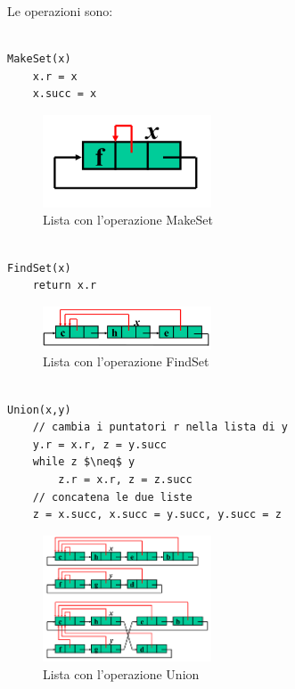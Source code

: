 Le operazioni sono:

\begin{lstlisting}

MakeSet(x)
	x.r = x
	x.succ = x

\end{lstlisting}

\begin{figure}[htpd]
\centering
\includegraphics[width=50mm]{images/list-make-set.png}
\caption{Lista con l'operazione MakeSet}
\end{figure}

\begin{lstlisting}

FindSet(x)
	return x.r

\end{lstlisting}

\begin{figure}[htpd]
\centering
\includegraphics[width=50mm]{images/list-find-set.png}
\caption{Lista con l'operazione FindSet}
\end{figure}

\begin{lstlisting}[mathescape=true]

Union(x,y)
	// cambia i puntatori r nella lista di y
	y.r = x.r, z = y.succ
	while z $\neq$ y
		z.r = x.r, z = z.succ
	// concatena le due liste
	z = x.succ, x.succ = y.succ, y.succ = z

\end{lstlisting}

\begin{figure}[htpd]
\centering
\includegraphics[width=50mm]{images/list-union.png}
\caption{Lista con l'operazione Union}
\end{figure}

